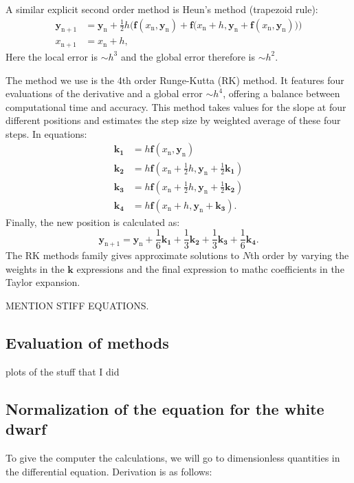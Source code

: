 \documentclass[]{article}
\renewcommand{\vec}[1]{\boldsymbol{#1}}
\begin{document}
	A similar explicit second order method is Heun's method (trapezoid rule):
	\begin{align}
		\vec{y}_\mathrm{n+1} &= \vec{y}_\mathrm{n} + \frac{1}{2} h \Big(\vec{f}(x_\mathrm{n}, \vec{y}_\mathrm{n}) + \vec{f}\big(x_\mathrm{n} + h, \vec{y}_\mathrm{n} + \vec{f}(x_\mathrm{n}, \vec{y}_\mathrm{n})\big)\Big)\\
		x_\mathrm{n+1} &= x_\mathrm{n} + h, \nonumber
	\end{align}
	Here the local error is $\sim h^3$ and the global error therefore is $\sim h^2$.

	The method we use is the 4th order Runge-Kutta (RK) method. It features four evaluations of the derivative and a global error $\sim h^4$, offering a balance between computational time and accuracy. This method takes values for the slope at four different positions and estimates the step size by weighted average of these four steps. In equations:
	\begin{align*}
		\vec{k_1} &= h \vec{f}(x_\mathrm{n}, \vec{y}_\mathrm{n})\\
		\vec{k_2} &= h \vec{f}\left(x_\mathrm{n} + \frac{1}{2} h, \vec{y}_\mathrm{n} + \frac{1}{2}\vec{k_1}\right)\\
		\vec{k_3} &= h \vec{f}\left(x_\mathrm{n} + \frac{1}{2} h, \vec{y}_\mathrm{n} + \frac{1}{2}\vec{k_2}\right)\\
		\vec{k_4} &= h \vec{f}(x_\mathrm{n} + h, \vec{y}_\mathrm{n} + \vec{k_3}).
	\end{align*}
	Finally, the new position is calculated as:
	\begin{equation}
		\vec{y}_\mathrm{n+1} = \vec{y}_\mathrm{n} + \frac{1}{6} \vec{k_1} + \frac{1}{3} \vec{k_2} + \frac{1}{3} \vec{k_3} + \frac{1}{6} \vec{k_4}.
	\end{equation}
	The RK methods family gives approximate solutions to $N$th order by varying the weights in the $\vec{k}$ expressions and the final expression to mathc coefficients in the Taylor expansion.

	{\color{red} MENTION STIFF EQUATIONS.}

\subsection{Evaluation of methods}
	plots of the stuff that I did
\subsection{Normalization of the equation for the white dwarf}
	To give the computer the calculations, we will go to dimensionless quantities in the differential equation. Derivation is as follows:
\end{document}
